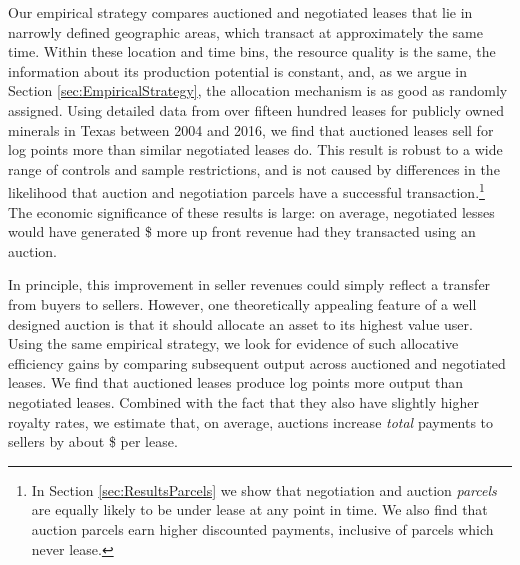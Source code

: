 \documentclass[12pt]{article}
\newcommand{\inputy}[1]{\unskip}
\begin{document}
Our empirical strategy compares auctioned and negotiated leases that lie in narrowly defined geographic areas, which transact at approximately the same time.  Within these location and time bins, the resource quality is the same, the information about its production potential is constant, and, as we argue in Section \ref{sec:EmpiricalStrategy}, the allocation mechanism is as good as randomly assigned.  Using detailed data from over fifteen hundred leases for publicly owned minerals in Texas between 2004 and 2016, we find that auctioned leases sell for \inputy{../output/estimates/Bonus_Grid10Yr_log.tex} log points more than similar negotiated leases do. This result is robust to a wide range of controls and sample restrictions, and is not caused by differences in the likelihood that auction and negotiation parcels have a successful transaction.\footnote{In Section \ref{sec:ResultsParcels} we show that negotiation and auction \textit{parcels} are equally likely to be under lease at any point in time. We also find that auction parcels earn higher discounted payments, inclusive of parcels which never lease.} The economic significance of these results is large: on average, negotiated lesses would have generated \$\inputy{../output/estimates/Bonus_Grid10Yr_log_total.tex} more up front revenue had they transacted using an auction.

In principle, this improvement in seller revenues could simply reflect a transfer from buyers to sellers. However, one theoretically appealing feature of a well designed auction is that it should allocate an asset to its highest value user. Using the same empirical strategy, we look for evidence of such allocative efficiency gains by comparing subsequent output across auctioned and negotiated leases. We find that auctioned leases produce \inputy{../output/estimates/Poisson_LeaseRevenue_Grid10Yr.tex} log points more output than negotiated leases. Combined with the fact that they also have slightly higher royalty rates, we estimate that, on average, auctions increase \textit{total} payments to sellers by about \$\inputy{../output/estimates/SellerRevenue_Grid10Yr_total.tex} per lease. 
\end{document}
